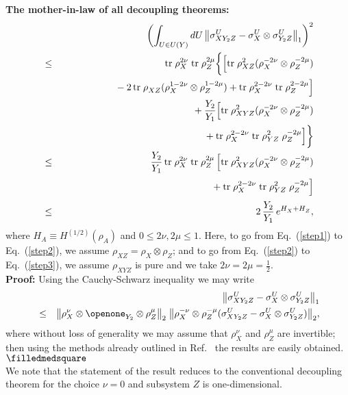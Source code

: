 \documentclass[12pt,aps,prl]{revtex4}
\begin{document}
\noindent
{\bf The mother-in-law of all decoupling theorems:}
\begin{eqnarray}
&&\biggl(\int_{U\in U(Y)}dU\,\bigl\| \sigma_{XY_2Z}^U-
\sigma_{X}^U\otimes \sigma_{Y_2Z}^U\bigr\|_1\biggr)^2\nonumber\\
&\le& {\text{tr}}\; \rho_{X}^{2\nu}\; {\text{tr}}\; \rho_{Z}^{2\mu}
\biggl\{\Bigl[ {\text{tr}}\; \rho_{XZ}^{2}
        ( \rho_{X}^{-2\nu}\otimes \rho_{Z}^{-2\mu})\nonumber\\
&&\phantom{{\text{tr}}\; \rho_{X}^{2\nu}\; {\text{tr}}\; \rho_{Z}^{2\mu}}
\;-2\, {\text{tr}}\; \rho_{XZ}^{\text{~}}
   (\rho_{X}^{1-2\nu}\otimes \rho_{Z}^{1-2\mu})
+{\text{tr}}\; \rho_{X}^{2-2\nu}\; {\text{tr}}\; \rho_{Z}^{2-2\mu}\Bigr]
\nonumber\\
&&\phantom{{\text{tr}}\; \rho_{X}^{2\nu}\; {\text{tr}} }
+\frac{Y_2}{Y_1}\Bigl[
{\text{tr}}\; \rho_{XYZ}^{2}
        ( \rho_{X}^{-2\nu}\otimes \rho_{Z}^{-2\mu}) \nonumber \\
&&\phantom{{\text{tr}}\; \rho_{X}^{2\nu}\; {\text{tr}}~~~~~~~~}
+{\text{tr}}\; \rho_{X}^{2-2\nu}\;
{\text{tr}}\; \rho_{YZ}^{2}\;\rho_{Z}^{-2\mu}\Bigr]
\biggr\} \label{step1}\\
&\le & \frac{Y_2}{Y_1}\, {\text{tr}}\; \rho_{X}^{2\nu}\;
{\text{tr}}\; \rho_{Z}^{2\mu}\,
\Bigl[
{\text{tr}}\; \rho_{XYZ}^{2}
        ( \rho_{X}^{-2\nu}\otimes \rho_{Z}^{-2\mu}) \nonumber \\
&&\phantom{\frac{Y_2}{Y_1}\, {\text{tr}}\; \rho_{X}^{2\nu}\; 
{\text{tr}}\; \rho_{Z}^{2\mu}\Bigl[\,}
+{\text{tr}}\; \rho_{X}^{2-2\nu}\; 
{\text{tr}}\; \rho_{YZ}^{2}\;\rho_{Z}^{-2\mu}\Bigr] \label{step2} \\
&\le & 2\, \frac{Y_2}{Y_1}\,
e^{H_X^{\text{~}}+H_Z^{\text{~}}},
\label{step3}
\end{eqnarray}
where $H_A^{\text{~}}\equiv H^{(1/2)}(\rho_A^{\text{~}})$
and $0\le 2\nu,2\mu\le 1$. Here, to go from Eq.~(\ref{step1})
to Eq.~(\ref{step2}), we assume
$\rho_{XZ}^{\text{~}}=\rho_X^{\text{~}}\otimes \rho_Z^{\text{~}}$; and
to go from Eq.~(\ref{step2}) to Eq.~(\ref{step3}), we assume
$\rho_{XYZ}^{\text{~}}$ is pure and we take $2\nu=2\mu=\frac{1}{2}$.
\\

\noindent
{\bf Proof:}
Using the Cauchy-Schwarz inequality we may write
\begin{eqnarray}
&&\bigl\| \sigma_{XY_2Z}^U-
\sigma_{X}^U\otimes \sigma_{Y_2Z}^U\bigr\|_1 \\
&\le& \bigl\| \rho_{X}^{\nu}\otimes\openone_{Y_2}^{\text{~}}\otimes
\rho_{Z}^{\mu} \bigr\|_2\;
\bigl\| \rho_{X}^{-\nu}\otimes \rho_{Z}^{-\mu}(\sigma_{XY_2Z}^U-
\sigma_{X}^U\otimes \sigma_{Y_2Z}^U)\bigr\|_2, \nonumber
\end{eqnarray}
where without loss of generality we may assume that $\rho_{X}^{\nu}$
and $\rho_{Z}^{\mu}$ are invertible; then using the methods already
outlined in Ref.~ the results are easily obtained.
$\hfill \ensuremath{\filledmedsquare}$\\
We note that the statement of the result reduces to the conventional
decoupling theorem for the choice $\nu=0$ and subsystem $Z$ is
one-dimensional.
\end{document}
